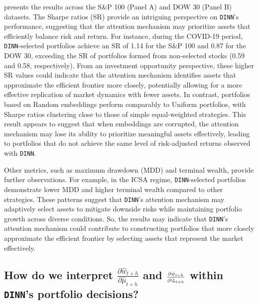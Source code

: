  presents the results across the S\&P 100 (Panel A) and DOW 30 (Panel B) datasets. The Sharpe ratios (SR) provide an intriguing perspective on \texttt{DINN}’s performance, suggesting that the attention mechanism may prioritize assets that efficiently balance risk and return. For instance, during the COVID-19 period, \texttt{DINN}-selected portfolios achieve an SR of 1.14 for the S\&P 100 and 0.87 for the DOW 30, exceeding the SR of portfolios formed from non-selected stocks (0.59 and 0.58, respectively). From an investment opportunity perspective\cite{kim2014cost}, these higher SR values could indicate that the attention mechanism identifies assets that approximate the efficient frontier more closely, potentially allowing for a more effective replication of market dynamics with fewer assets. In contrast, portfolios based on Random embeddings perform comparably to Uniform portfolios, with Sharpe ratios clustering close to those of simple equal-weighted strategies. This result appears to suggest that when embeddings are corrupted, the attention mechanism may lose its ability to prioritize meaningful assets effectively, leading to portfolios that do not achieve the same level of risk-adjusted returns observed with \texttt{DINN}.  

Other metrics, such as maximum drawdown (MDD) and terminal wealth, provide further observations. For example, in the ICSA regime, \texttt{DINN}-selected portfolios demonstrate lower MDD and higher terminal wealth compared to other strategies. These patterns suggest that \texttt{DINN}’s attention mechanism may adaptively select assets to mitigate downside risks while maintaining portfolio growth across diverse conditions. So, the results may indicate that \texttt{DINN}’s attention mechanism could contribute to constructing portfolios that more closely approximate the efficient frontier by selecting assets that represent the market effectively.

\subsection{How do we interpret $\frac{\partial \hat{w}_{t+h}}{\partial \hat{\mu}_{t+h}}$ and $\frac{\partial \hat{w}_{t+h}}{\partial \hat{\L}_{t+h}}$ within \texttt{DINN}'s portfolio decisions?}

